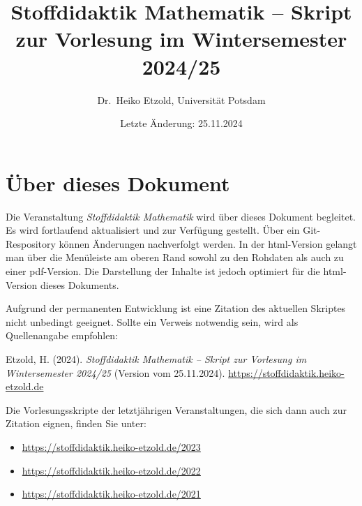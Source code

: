 \documentclass[
]{scrbook}
\title{Stoffdidaktik Mathematik -- Skript zur Vorlesung im Wintersemester 2024/25}
\author{Dr.~Heiko Etzold, Universität Potsdam}
\date{Letzte Änderung: 25.11.2024}
\makeatletter
\providecommand{\tightlist}{%
  \setlength{\itemsep}{0pt}\setlength{\parskip}{0pt}}
\renewenvironment{quote}{
  \list{}{
	\leftmargin0.2cm   %
    \rightmargin\leftmargin
      	\def\FrameCommand
    {%
        {\color{quoteColor}\vrule width 2pt}%
        \hspace{0pt}%
    }%
    \MakeFramed{\advance \hsize -\width \FrameRestore}    \color{quoteColor}
    }
  \item\relax
}
{\endlist\color{black}\endMakeFramed}
\def\renewtheorem#1{%
  \expandafter\let\csname#1\endcsname\relax
  \expandafter\let\csname c@#1\endcsname\relax
  \gdef\renewtheorem@envname{#1}
  \renewtheorem@secpar
}
\def\renewtheorem@secpar{\@ifnextchar[{\renewtheorem@numberedlike}{\renewtheorem@nonumberedlike}}
\def\renewtheorem@numberedlike[#1]#2{\newtheorem{\renewtheorem@envname}[#1]{#2}}
\def\renewtheorem@nonumberedlike#1{
\def\renewtheorem@caption{#1}
\edef\renewtheorem@nowithin{\noexpand\newtheorem{\renewtheorem@envname}{\renewtheorem@caption}}
\renewtheorem@thirdpar
}
\def\renewtheorem@thirdpar{\@ifnextchar[{\renewtheorem@within}{\renewtheorem@nowithin}}
\def\renewtheorem@within[#1]{\renewtheorem@nowithin[#1]}
\theoremstyle{definition}
\theoremstyle{definition}
\theoremstyle{definition}
\theoremstyle{definition}
\theoremstyle{remark}
\makeatother
\begin{document}
\maketitle

%

{
\hypersetup{linkcolor=}
\setcounter{tocdepth}{1}
\tableofcontents
}
\chapter*{Über dieses Dokument}\label{uxfcber-dieses-dokument}

Die Veranstaltung \emph{Stoffdidaktik Mathematik} wird über dieses Dokument begleitet. Es wird fortlaufend aktualisiert und zur Verfügung gestellt. Über ein Git-Respository können Änderungen nachverfolgt werden.
In der html-Version gelangt man über die Menüleiste am oberen Rand sowohl zu den Rohdaten als auch zu einer pdf-Version. Die Darstellung der Inhalte ist jedoch optimiert für die html-Version dieses Dokuments.

Aufgrund der permanenten Entwicklung ist eine Zitation des aktuellen Skriptes nicht unbedingt geeignet. Sollte ein Verweis notwendig sein, wird als Quellenangabe empfohlen:

\begin{quote}
Etzold, H. (2024). \emph{Stoffdidaktik Mathematik -- Skript zur Vorlesung im Wintersemester 2024/25} (Version vom 25.11.2024). \url{https://stoffdidaktik.heiko-etzold.de}
\end{quote}

Die Vorlesungsskripte der letztjährigen Veranstaltungen, die sich dann auch zur Zitation eignen, finden Sie unter:

\begin{itemize}
\tightlist
\item
  \url{https://stoffdidaktik.heiko-etzold.de/2023}
\item
  \url{https://stoffdidaktik.heiko-etzold.de/2022}
\item
  \url{https://stoffdidaktik.heiko-etzold.de/2021}
\end{itemize}
\end{document}
